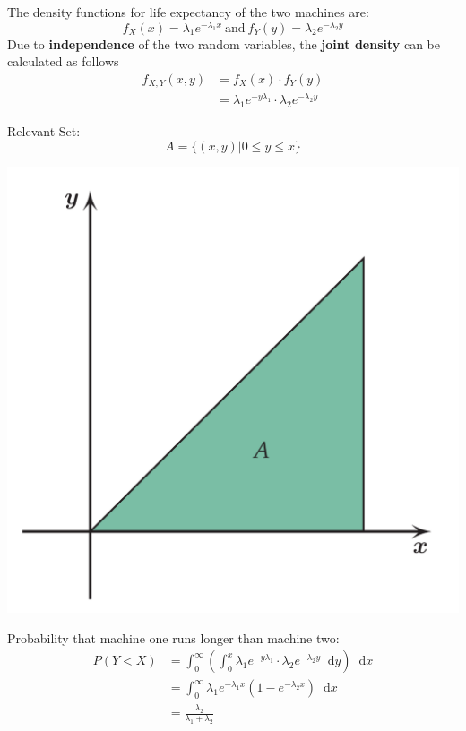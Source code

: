 \documentclass[11pt]{article}
\newcommand*\diff{\mathop{}\!\mathrm{d}}
\begin{document}
The density functions for life expectancy of the two machines are:
\begin{equation*}
	f_X(x) = \lambda_1 e^{-\lambda_1 x}\ \text{and}\ f_Y(y) = \lambda_2 e^{-\lambda_2 y}
\end{equation*}
Due to \textbf{independence} of the two random variables, the \textbf{joint density} can be calculated as follows
\begin{align}
	f_{X,Y} (x,y) &= f_X(x) \cdot f_Y(y)\\
	&= \lambda_1 e^{-y\lambda_1} \cdot \lambda_2 e^{-\lambda_2 y}
\end{align}
\begin{minipage}{0.6\linewidth}
	Relevant Set:
	\begin{equation*}
		A = \{(x,y)|0\leq y\leq x\}
	\end{equation*}
\end{minipage}
\begin{minipage}{0.4\linewidth}
	\begin{center}
		\includegraphics[width=0.6\linewidth]{img/area_A_under_xy}
	\end{center}	
\end{minipage}
Probability that machine one runs longer than machine two:
\begin{align*}
	P(Y<X) &= \int_{0}^{\infty}(\int_{0}^{x} \lambda_1 e^{-y\lambda_1} \cdot \lambda_2 e^{-\lambda_2 y} \diff y )\diff x\\
	&= \int_{0}^{\infty} \lambda_1e^{-\lambda_1 x} (1 - e^{-\lambda_2 x})\diff x\\
	&= \frac{\lambda_2}{\lambda_1 + \lambda_2}
\end{align*}
\end{document}
